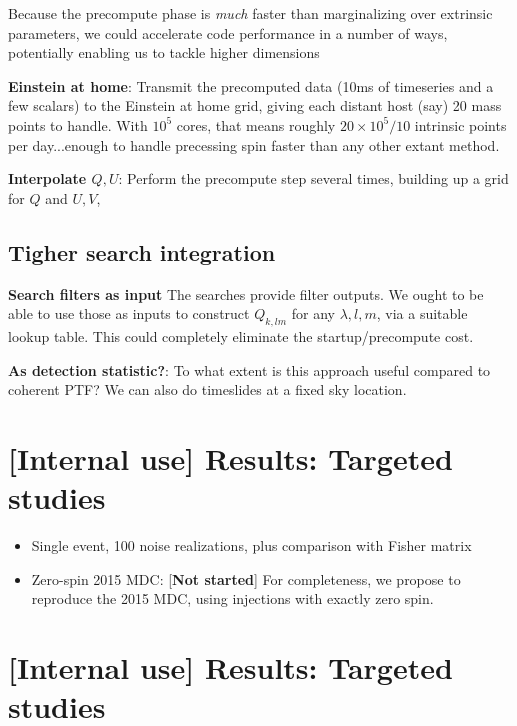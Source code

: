 Because the precompute phase is \emph{much} faster than marginalizing over extrinsic parameters, we could accelerate
code performance in a number of ways, potentially enabling us to tackle higher dimensions

\noindent \textbf{Einstein at home}: Transmit the precomputed data (10ms of timeseries and a few scalars) to the
Einstein at home grid, giving each distant host (say) 20 mass points to handle.  With $10^5$ cores, that means roughly
$20\times10^5/10$ intrinsic points per day...enough to handle precessing spin faster than any other extant method.

\noindent \textbf{Interpolate $Q,U$}: Perform the precompute step several times, building up a grid for $Q$ and $U,V$,

\subsection{Tigher search integration}


\noindent \textbf{Search filters as input}
The searches provide filter outputs.  We ought to be able to use those as inputs to construct $Q_{k,lm}$ for any
$\lambda,l,m$, via a suitable lookup table.   This could completely eliminate the startup/precompute cost.



\noindent \textbf{As detection statistic?}: To what extent is this approach useful compared to coherent PTF?  We can
also do timeslides at a fixed sky location.


\section{[Internal use] Results: Targeted studies}

\begin{itemize}
\item Single event, 100 noise realizations, plus comparison with Fisher matrix

\item Zero-spin 2015 MDC: [\textbf{Not started}]  For completeness, we propose to reproduce the 2015 MDC,  using
  injections with exactly zero spin.

\end{itemize}

\section{[Internal use] Results: Targeted studies}

